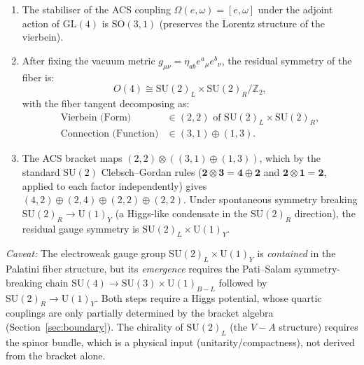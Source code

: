 \documentclass[11pt,a4paper]{article}
\theoremstyle{plain}
\theoremstyle{definition}
\theoremstyle{remark}
\begin{document}
\begin{enumerate}[label=(\arabic*)]
  \item The stabiliser of the ACS coupling $\Omega(e,\omega) = [e,\omega]$ 
    under the adjoint action of $\mathrm{GL}(4)$ is $\mathrm{SO}(3,1)$ 
    (preserves the Lorentz structure of the vierbein).

  \item After fixing the vacuum metric $g_{\mu\nu} = \eta_{ab}e^a{}_\mu e^b{}_\nu$,
    the residual symmetry of the fiber is:
    \begin{equation}
      O(4) \cong \mathrm{SU}(2)_L \times \mathrm{SU}(2)_R / \mathbb{Z}_2,
    \end{equation}
    with the fiber tangent decomposing as:
    \begin{align}
      \text{Vierbein (Form)} &\in (2,2) \text{ of } \mathrm{SU}(2)_L \times \mathrm{SU}(2)_R,\\
      \text{Connection (Function)} &\in (3,1) \oplus (1,3).
    \end{align}

  \item The ACS bracket maps
    $(2,2) \otimes ((3,1)\oplus(1,3))$, which by the standard $\mathrm{SU}(2)$
    Clebsch--Gordan rules ($\mathbf{2}\otimes\mathbf{3} = \mathbf{4}\oplus\mathbf{2}$
    and $\mathbf{2}\otimes\mathbf{1} = \mathbf{2}$, applied to each factor independently)
    gives $(4,2)\oplus(2,4)\oplus(2,2)\oplus(2,2)$.
    Under spontaneous symmetry breaking $\mathrm{SU}(2)_R \to \mathrm{U}(1)_Y$
    (a Higgs-like condensate in the $\mathrm{SU}(2)_R$ direction), the 
    residual gauge symmetry is $\mathrm{SU}(2)_L \times \mathrm{U}(1)_Y$.
\end{enumerate}

\noindent
\textit{Caveat:}
The electroweak gauge group $\mathrm{SU}(2)_L \times \mathrm{U}(1)_Y$ is
\emph{contained} in the Palatini fiber structure, but its \emph{emergence}
requires the Pati--Salam symmetry-breaking chain
$\mathrm{SU}(4) \to \mathrm{SU}(3) \times \mathrm{U}(1)_{B{-}L}$
followed by $\mathrm{SU}(2)_R \to \mathrm{U}(1)_Y$.
Both steps require a Higgs potential, whose quartic couplings are
only partially determined by the bracket algebra
(Section~\ref{sec:boundary}).  The chirality of $\mathrm{SU}(2)_L$
(the $V{-}A$ structure) requires the spinor bundle, which is a
physical input (unitarity/compactness), not derived from the
bracket alone.
\end{document}
